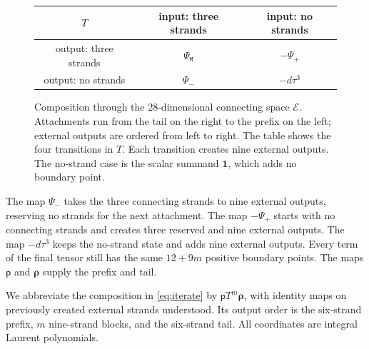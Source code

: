 \documentclass[a4paper,11pt]{amsart}
\newcommand{\one}{\mathbf1}
\newcommand{\wordmiddle}{\mathtt{M}}
\newcommand{\middlemap}{{\Psi}_{{\wordmiddle}}}
\newcommand{\createmap}{{\Psi}_+}
\newcommand{\removemap}{{\Psi}_-}
\newcommand{\pp}{\mathsf p}
\newcommand{\tailmap}{\boldsymbol{\rho}}
\numberwithin{equation}{subsection}
\theoremstyle{plain}
\theoremstyle{definition}
\theoremstyle{remark}
\begin{document}
\begin{figure}[ht]
\centering
{}
\par\medskip
\begin{tabular}{c|cc}
$T$&input: three strands&input: no strands\\\hline
output: three strands&$\middlemap$&$-\createmap$\\
output: no strands&$\removemap$&$-d\tau^3$
\end{tabular}
\caption{Composition through the $28$-dimensional connecting
space $\mathcal E$. Attachments run from the tail on the right to the
prefix on the left; external outputs are ordered from left to right.
The table shows the four transitions in $T$. Each transition creates
nine external outputs. The no-strand case is the scalar summand
$\one$, which adds no boundary point.}
\label{fig:interface}
\end{figure}

The map $\removemap$ takes the three connecting strands to nine external
outputs, reserving no strands for the next attachment. The map $-\createmap$
starts with no connecting strands and creates three reserved and nine
external outputs. The map $-d\tau^3$ keeps the no-strand state and adds
nine external outputs. Every term of the final tensor still has
the same $12+9m$ positive boundary points.
The maps $\pp$ and $\tailmap$ supply the prefix and tail.

We abbreviate the composition in \autoref{eq:iterate} by
$\pp T^m\tailmap$, with identity maps on previously created external
strands understood. Its output order is the six-strand prefix,
$m$ nine-strand blocks, and the six-strand tail. All coordinates
are integral Laurent polynomials.
\end{document}
